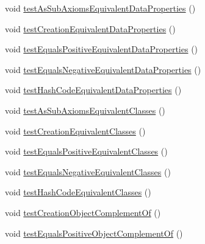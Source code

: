 \begin{DoxyCompactItemize}
void \hyperlink{classorg_1_1semanticweb_1_1owlapi_1_1datafactory_1_1_o_w_l_data_factory_test_case_a8dac33d28158197f90dba7315e8bf1e8}{test\-As\-Sub\-Axioms\-Equivalent\-Data\-Properties} ()
\item 
void \hyperlink{classorg_1_1semanticweb_1_1owlapi_1_1datafactory_1_1_o_w_l_data_factory_test_case_a34b01a64d0ac055120c8ae59ceb06abc}{test\-Creation\-Equivalent\-Data\-Properties} ()
\item 
void \hyperlink{classorg_1_1semanticweb_1_1owlapi_1_1datafactory_1_1_o_w_l_data_factory_test_case_a157ef861f50cfaf9059f1a3e8c2e1265}{test\-Equals\-Positive\-Equivalent\-Data\-Properties} ()
\item 
void \hyperlink{classorg_1_1semanticweb_1_1owlapi_1_1datafactory_1_1_o_w_l_data_factory_test_case_a9829788ee14c85542c8f7c3287a2a4af}{test\-Equals\-Negative\-Equivalent\-Data\-Properties} ()
\item 
void \hyperlink{classorg_1_1semanticweb_1_1owlapi_1_1datafactory_1_1_o_w_l_data_factory_test_case_ad3ffc05d77b40a02d5c51b15701bb324}{test\-Hash\-Code\-Equivalent\-Data\-Properties} ()
\item 
void \hyperlink{classorg_1_1semanticweb_1_1owlapi_1_1datafactory_1_1_o_w_l_data_factory_test_case_adb4cd7d076c15e3b477eb36bc9e51dd6}{test\-As\-Sub\-Axioms\-Equivalent\-Classes} ()
\item 
void \hyperlink{classorg_1_1semanticweb_1_1owlapi_1_1datafactory_1_1_o_w_l_data_factory_test_case_abfef19aca77a32007d4499f51b38caa5}{test\-Creation\-Equivalent\-Classes} ()
\item 
void \hyperlink{classorg_1_1semanticweb_1_1owlapi_1_1datafactory_1_1_o_w_l_data_factory_test_case_abaa69fe555fb94c5625176cc8cf0ebfc}{test\-Equals\-Positive\-Equivalent\-Classes} ()
\item 
void \hyperlink{classorg_1_1semanticweb_1_1owlapi_1_1datafactory_1_1_o_w_l_data_factory_test_case_a8b1fafbdbc1ace3c06076e6783438018}{test\-Equals\-Negative\-Equivalent\-Classes} ()
\item 
void \hyperlink{classorg_1_1semanticweb_1_1owlapi_1_1datafactory_1_1_o_w_l_data_factory_test_case_ac4e55b208c07736036832ad554529dc4}{test\-Hash\-Code\-Equivalent\-Classes} ()
\item 
void \hyperlink{classorg_1_1semanticweb_1_1owlapi_1_1datafactory_1_1_o_w_l_data_factory_test_case_a64c1ac689ee2fa4ca78722e349d39b93}{test\-Creation\-Object\-Complement\-Of} ()
\item 
void \hyperlink{classorg_1_1semanticweb_1_1owlapi_1_1datafactory_1_1_o_w_l_data_factory_test_case_a3edddea4f8f23ac4c5208bc3f83c6b19}{test\-Equals\-Positive\-Object\-Complement\-Of} ()

\end{DoxyCompactItemize}
